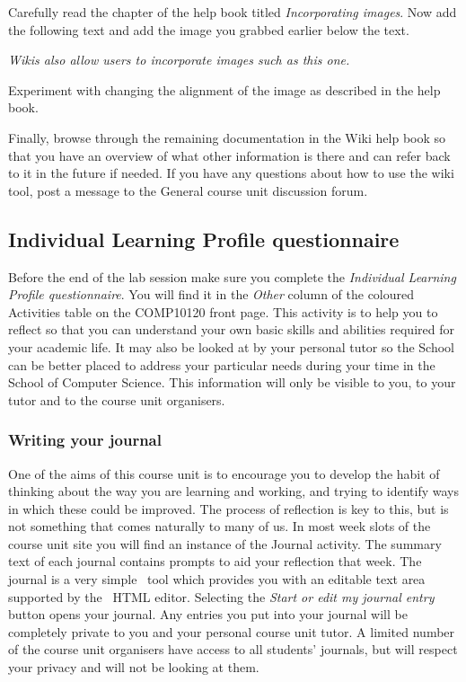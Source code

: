 Carefully read the chapter of the help book titled \emph{Incorporating images}.  Now add the following text and add the image you grabbed earlier below the text.

\emph{Wikis also allow users to incorporate images such as this one.} 

Experiment with changing the alignment of the image as described in the help book.

Finally, browse through the remaining documentation in the Wiki help book so that you have an overview of what other information is there and can refer back to it in the future if needed. If you have any questions about how to use the wiki tool, post a message to the General course unit discussion forum.

\subsection{Individual Learning Profile questionnaire}
\label{sec:indiv-learn-prof}

Before the end of the lab session make sure you complete the \emph{Individual Learning Profile questionnaire}. You will find it in the \emph{Other} column of the coloured Activities table on the COMP10120 front page. This activity is to help you to reflect so that you can understand your own basic skills and abilities required for your academic life. It may also be looked at by your personal tutor so the School can be better placed to address your particular needs during your time in the School of Computer Science. This information will only be visible to you, to your tutor and to the course unit organisers.

\subsubsection*{Writing your journal}
\label{sec:writing-your-journal}


One of the aims of this course unit is to encourage you to develop the habit of thinking about the way you are learning and working, and trying to identify ways in which these could be improved. The process of reflection is key to this, but is not something that comes naturally to many of us. In most week slots of the course unit site you will find an instance of the Journal activity. The summary text of each journal contains prompts to aid your reflection that week. The journal is a very simple \moodle\ tool which provides you with an editable text area supported by the \moodle\ HTML editor. Selecting the \emph{Start or edit my journal entry} button opens your journal. Any entries you put into your journal will be completely private to you and your personal course unit tutor. A limited number of the course unit organisers have access to all students' journals, but will respect your privacy and will not be looking at them.

